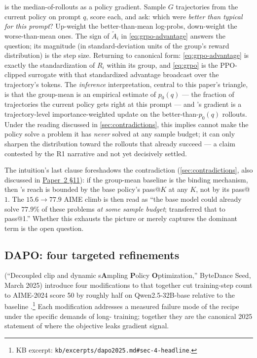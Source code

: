 \begin{intuition}
 is the median-of-rollouts as a policy gradient. Sample $G$
trajectories from the current policy on prompt $q$, score each, and
ask: which were \emph{better than typical for this prompt}? Up-weight
the better-than-mean log-probs, down-weight the worse-than-mean ones.
The sign of $\tilde{A}_i$ in \cref{eq:grpo-advantage} answers the
question; its magnitude (in standard-deviation units of the group's
reward distribution) is the step size. Returning to canonical form:
\cref{eq:grpo-advantage} is exactly the standardization of $R_i$ within
its group, and \cref{eq:grpo} is the PPO-clipped surrogate with that
standardized advantage broadcast over the trajectory's tokens. The
\emph{inference} interpretation, central to this paper's triangle, is
that the group-mean is an empirical estimate of $p_0(q)$ --- the
fraction of trajectories the current policy gets right at this prompt
--- and 's gradient is a trajectory-level importance-weighted
update on the better-than-$p_0(q)$ rollouts. Under the
\citet{rlvr-limits-2025} reading discussed in
\cref{sec:contradictions}, this implies  cannot make the policy
solve a problem it has \emph{never} solved at any sample budget; it
can only sharpen the distribution toward the rollouts that already
succeed --- a claim contested by the R1 narrative \citep[\S
2.3]{deepseek-r1} and not yet decisively settled.
\end{intuition}

The intuition's last clause foreshadows the
\citet{rlvr-limits-2025} contradiction (\cref{sec:contradictions}, also
discussed in \hyperref[P2-sec:rlvr-grpo]{Paper~2 §11}): if the group-mean baseline is the binding
mechanism, then 's reach is bounded by the base policy's pass@$K$
at any $K$, not by its pass@$1$. The $15.6 \to 77.9$ AIME climb is then
read as ``the base model could already solve $77.9\%$ of these problems
\emph{at some sample budget};  transferred that to pass@1.''
Whether this exhausts the picture or merely captures the dominant term
is the open question.

\subsection{DAPO: four targeted refinements}
\label{sec:rlvr-dapo}

\citet{dapo2025} (``Decoupled clip and dynamic s\textbf{A}mpling
\textbf{P}olicy \textbf{O}ptimization,'' ByteDance Seed, March 2025)
introduce four modifications to  that together cut training-step
count to AIME-2024 score 50 by roughly half on Qwen2.5-32B-base
relative to the  baseline \citep[\S
4]{dapo2025}.\footnote{KB excerpt:
\texttt{kb/excerpts/dapo2025.md\#sec-4-headline}.} Each modification
addresses a measured failure mode of the  recipe under the
specific demands of long- training; together they are the canonical
2025 statement of where the  objective leaks gradient signal.

